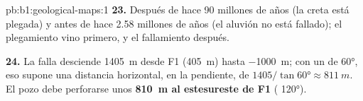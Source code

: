\begin{solution}{pb:b1:geological-maps:1}
\textbf{23.} Después de hace 90 millones de años (la creta está plegada) y antes de hace 2.58
millones de años (el aluvión no está fallado); el plegamiento vino primero, y el fallamiento después.

\textbf{24.} La falla desciende \qty{1405}{m} desde F1 (\qty{405}{m}) hasta \qty{-1000}{m}; con un
 de \ang{60}, eso supone una distancia horizontal, en la pendiente, de
$1405/\tan\ang{60} \approx \qty{811}{m}$. El pozo debe perforarse unos
\textbf{\qty[text-series-to-math=true]{810}{m} al estesureste de F1} ( \ang{120}).
\end{solution}
